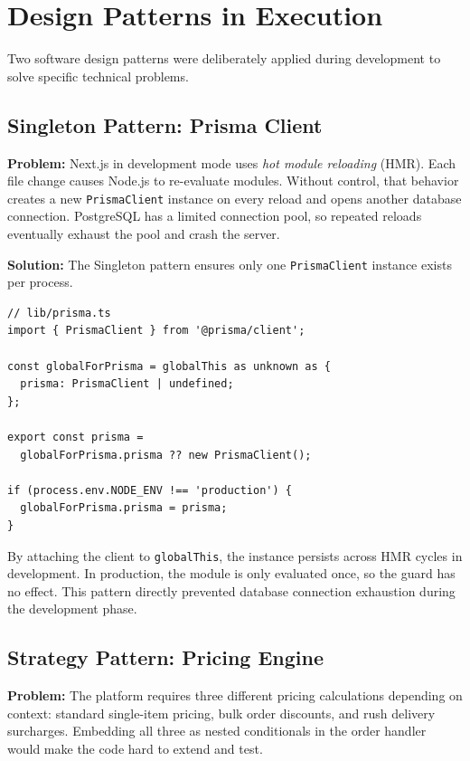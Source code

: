 \documentclass[12pt,a4paper]{report}
\begin{document}
\section{Design Patterns in Execution}

Two software design patterns were deliberately applied during development to solve specific technical problems.

\subsection{Singleton Pattern: Prisma Client}

\textbf{Problem:} Next.js in development mode uses \textit{hot module reloading} (HMR). Each file change causes Node.js to re-evaluate modules. Without control, that behavior creates a new \texttt{PrismaClient} instance on every reload and opens another database connection. PostgreSQL has a limited connection pool, so repeated reloads eventually exhaust the pool and crash the server.

\textbf{Solution:} The Singleton pattern ensures only one \texttt{PrismaClient} instance exists per process.

\begin{verbatim}
// lib/prisma.ts
import { PrismaClient } from '@prisma/client';

const globalForPrisma = globalThis as unknown as {
  prisma: PrismaClient | undefined;
};

export const prisma =
  globalForPrisma.prisma ?? new PrismaClient();

if (process.env.NODE_ENV !== 'production') {
  globalForPrisma.prisma = prisma;
}
\end{verbatim}

By attaching the client to \texttt{globalThis}, the instance persists across HMR cycles in development. In production, the module is only evaluated once, so the guard has no effect. This pattern directly prevented database connection exhaustion during the development phase.

\subsection{Strategy Pattern: Pricing Engine}

\textbf{Problem:} The platform requires three different pricing calculations depending on context: standard single-item pricing, bulk order discounts, and rush delivery surcharges. Embedding all three as nested conditionals in the order handler would make the code hard to extend and test.
\end{document}
